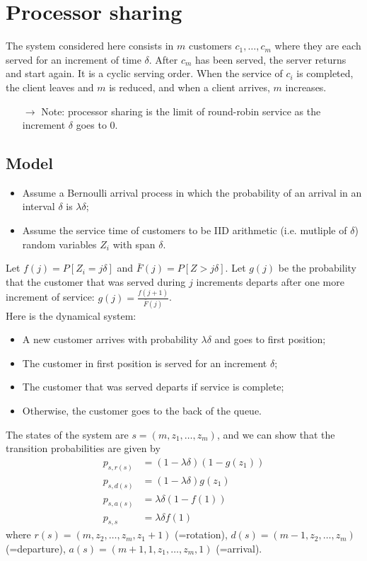 \documentclass[12pt, openany]{report}
\theoremstyle{definition}
\begin{document}
\section{Processor sharing}
The system considered here consists in $m$ customers $c_1,\dots,c_m$ where they are each served for an increment of time $\delta$. After $c_m$ has been served, the server returns and start again. It is a cyclic serving order. When the service of $c_i$ is completed, the client leaves and $m$ is reduced, and when a client arrives, $m$ increases. 
\begin{itemize}
	\item [$\to$] Note: processor sharing is the limit of round-robin service as the increment $\delta$ goes to 0. 
\end{itemize}
\subsection{Model}
\begin{itemize}
	\item Assume a Bernoulli arrival process in which the probability of an arrival in an interval $\delta$ is $\lambda \delta$;
	\item Assume the service time of customers to be IID arithmetic (i.e. mutliple of $\delta$) random variables $Z_i$ with span $\delta$.
\end{itemize}
Let $f(j)=P[Z_i=j\delta]$ and $\bar F(j)=P[Z>j\delta]$. Let $g(j)$ be the probability that the customer that was served during $j$ increments departs after one more increment of service: $g(j) = \frac{f(j+1)}{\bar F(j)}$.\\
Here is the dynamical system:
\begin{itemize}
	\item A new customer arrives with probability $\lambda \delta$ and goes to first position;
	\item The customer in first position is served for an increment $\delta$;
	\item The customer that was served departs if service is complete;
	\item Otherwise, the customer goes to the back of the queue.
\end{itemize}
The states of the system are $s=(m, z_1,\dots,z_m)$, and we can show that the transition probabilities are given by
\begin{equation}
	\begin{aligned}
		p_{s,r(s)} &= (1-\lambda \delta)(1-g(z_1))\\
		p_{s,d(s)} &= (1-\lambda \delta)g(z_1)\\
		p_{s,a(s)} &= \lambda \delta (1-f(1))\\
		p_{s,s} &= \lambda \delta f(1)
	\end{aligned}
\end{equation}
where $r(s)=(m, z_2,\dots,z_m, z_1+1)$ (=rotation), $d(s)=(m-1, z_2,\dots,z_m)$ (=departure), $a(s)=(m+1, 1, z_1,\dots,z_m,1)$ (=arrival). 
\end{document}

